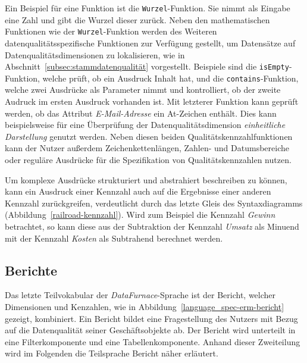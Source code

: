 \documentclass[
  language=german, %
  type=bachelor,%
  ngerman
]{isthesis}
\begin{document}
\begin{content}
	Ein Beispiel für eine Funktion ist die \texttt{Wurzel}-Funktion.  Sie nimmt
	als Eingabe eine Zahl und gibt die Wurzel dieser zurück. Neben den
	mathematischen Funktionen wie der \texttt{Wurzel}-Funktion werden des
	Weiteren datenqualitätsspezifische Funktionen zur Verfügung gestellt, um
	Datensätze auf Datenqualitätsdimensionen zu lokalisieren, wie in
	Abschnitt~\ref{subsec:stammdatenqualität} vorgestellt.  Beispiele sind die
	\texttt{isEmpty}-Funktion, welche prüft, ob ein Ausdruck Inhalt hat, und die
	\texttt{contains}-Funktion, welche zwei Ausdrücke als Parameter nimmt und
	kontrolliert, ob der zweite Audruck im ersten Ausdruck vorhanden ist. Mit
	letzterer Funktion kann \zB{} geprüft werden, ob das Attribut
	\textit{E-Mail-Adresse} ein At-Zeichen enthält. Dies kann beispielsweise für
	eine Überprüfung der Datenqualitätsdimension \textit{einheitliche
	Darstellung} genutzt werden. Neben diesen beiden Qualitätskennzahlfunktionen
	kann der Nutzer außerdem Zeichenkettenlängen, Zahlen- und Datumsbereiche oder
	reguläre Ausdrücke für die Spezifikation von Qualitätskennzahlen nutzen.


  Um komplexe Ausdrücke strukturiert und abstrahiert beschreiben zu können,
  kann ein Ausdruck einer Kennzahl auch auf die Ergebnisse einer anderen
  Kennzahl zurückgreifen, verdeutlicht durch das letzte Gleis des
  Syntaxdiagramms (Abbildung~\ref{railroad-kennzahl}). Wird zum Beispiel die
  Kennzahl \textit{Gewinn} betrachtet, so kann diese aus der Subtraktion der
  Kennzahl \textit{Umsatz} als Minuend mit der Kennzahl \textit{Kosten} als
  Subtrahend berechnet werden.


  \subsection{Berichte}

  Das letzte Teilvokabular der \textit{DataFurnace}-Sprache ist der Bericht,
  welcher Dimensionen und Kenzahlen, wie in
  Abbildung~\ref{language_spec-erm-bericht} gezeigt, kombiniert. Ein Bericht
  bildet eine Fragestellung des Nutzers mit Bezug auf die Datenqualität seiner
  Geschäftsobjekte ab. Der Bericht wird unterteilt in eine Filterkomponente und
  eine Tabellenkomponente. Anhand dieser Zweiteilung wird im Folgenden die
  Teilsprache Bericht näher erläutert.


\end{content}
\end{document}
